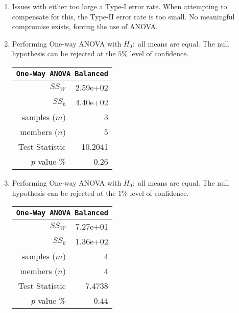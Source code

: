 \begin{enumerate}
	\item Issues with either too large a Type-I error rate. When attempting to compensate for this, the Type-II error rate is too small. No meaningful compromise exists, forcing the use of ANOVA.\\
	
	\item Performing One-way ANOVA with $ H_0 : $ all means are equal. The null hypothesis can be rejected at the $ 5\% $ level of confidence.\\
	
	\begin{table}[H]
		\centering
		\begin{tabular}{@{}rr@{}}
			\toprule
			\multicolumn{2}{c}{\texttt{One-Way ANOVA Balanced}} \\
			\midrule
			$SS_W$         &               2.59e+02 \\
			$SS_b$         &               4.40e+02 \\
			samples ($m$)  &                      3 \\
			members ($n$)  &                      5 \\
			Test Statistic &                10.2041 \\
			$p$ value \%   &                   0.26 \\
			\bottomrule
		\end{tabular}
		\bigskip
	\end{table}

	\item Performing One-way ANOVA with $ H_0 : $ all means are equal. The null hypothesis can be rejected at the $ 1\% $ level of confidence.
	
	\begin{table}[H]
		\centering
		\begin{tabular}{@{}rr@{}}
			\toprule
			\multicolumn{2}{c}{\texttt{One-Way ANOVA Balanced}} \\
			\midrule
			$SS_W$         &               7.27e+01 \\
			$SS_b$         &               1.36e+02 \\
			samples ($m$)  &                      4 \\
			members ($n$)  &                      4 \\
			Test Statistic &                 7.4738 \\
			$p$ value \%   &                   0.44 \\
			\bottomrule
		\end{tabular}
		

\end{table}
\end{enumerate}
